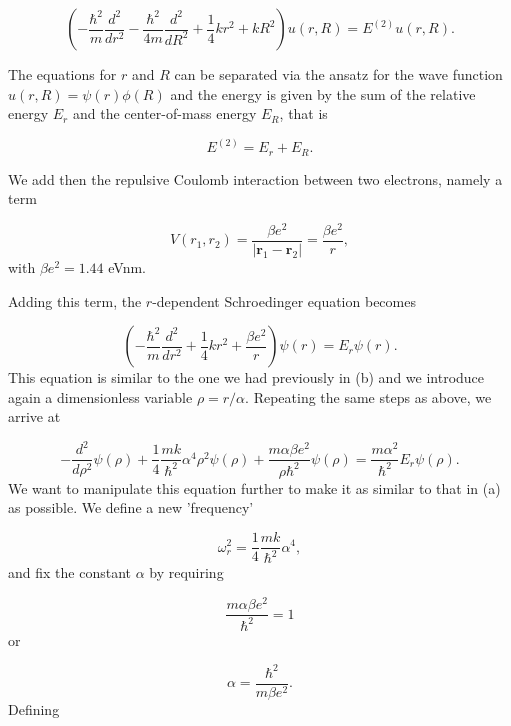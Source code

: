 \documentclass[%
oneside,                 %
final,                   %
10pt]{article}
\begin{document}
\begin{equation*}
\left(  -\frac{\hbar^2}{m} \frac{d^2}{dr^2} -\frac{\hbar^2}{4 m} \frac{d^2}{dR^2}+ \frac{1}{4} k r^2+  kR^2\right)u(r,R)  = E^{(2)} u(r,R).
\end{equation*}

The equations for $r$ and $R$ can be separated via the ansatz for the 
wave function $u(r,R) = \psi(r)\phi(R)$ and the energy is given by the sum
of the relative energy $E_r$ and the center-of-mass energy $E_R$, that
is

\begin{equation*}
E^{(2)}=E_r+E_R.
\end{equation*}

We add then the repulsive Coulomb interaction between two electrons,
namely a term

\begin{equation*}
V(r_1,r_2) = \frac{\beta e^2}{|\mathbf{r}_1-\mathbf{r}_2|}=\frac{\beta e^2}{r},
\end{equation*}
with $\beta e^2=1.44$ eVnm.

Adding this term, the $r$-dependent Schroedinger equation becomes

\begin{equation*}
\left(  -\frac{\hbar^2}{m} \frac{d^2}{dr^2}+ \frac{1}{4}k r^2+\frac{\beta e^2}{r}\right)\psi(r)  = E_r \psi(r).
\end{equation*}
This equation is similar to the one we had previously in (b) and we introduce
again a dimensionless variable $\rho = r/\alpha$. Repeating the same
steps as above, we arrive at

\begin{equation*}
  -\frac{d^2}{d\rho^2} \psi(\rho) 
       + \frac{1}{4}\frac{mk}{\hbar^2} \alpha^4\rho^2\psi(\rho)+\frac{m\alpha \beta e^2}{\rho\hbar^2}\psi(\rho)  = 
\frac{m\alpha^2}{\hbar^2}E_r \psi(\rho) .
\end{equation*}
We want to manipulate this equation further to make it as similar to that in (a)
as possible. We define a new 'frequency'

\begin{equation*}
\omega_r^2=\frac{1}{4}\frac{mk}{\hbar^2} \alpha^4,
\end{equation*}
and fix the constant $\alpha$ by requiring

\begin{equation*}
\frac{m\alpha \beta e^2}{\hbar^2}=1
\end{equation*}
or

\begin{equation*}
\alpha = \frac{\hbar^2}{m\beta e^2}.
\end{equation*}
Defining
\end{document}
